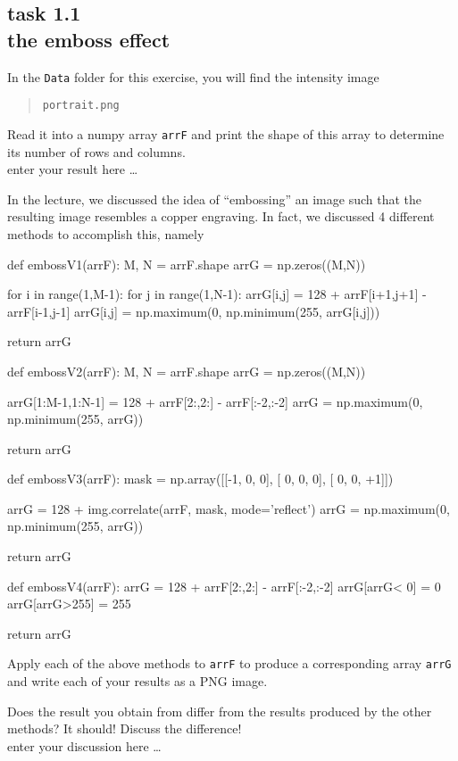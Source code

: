 
\subsection*{task 1.1 \\[1ex] the emboss effect}

In the \texttt{Data} folder for this exercise, you will find the intensity image
\begin{quote}
    \texttt{portrait.png}
\end{quote}
Read it into a numpy array \texttt{arrF} and print the shape of this array to determine its number of rows and columns.
\color{blue} \\[1ex]
enter your result here \ldots
\color{black}

In the lecture, we discussed the idea of ``embossing'' an image such that the resulting image resembles a copper engraving. In fact, we discussed 4 different methods to accomplish this, namely
\begin{python}[emph={embossV1,embossV2,embossV3,embossV4}]
def embossV1(arrF):
    M, N = arrF.shape
    arrG = np.zeros((M,N))

    for i in range(1,M-1):
        for j in range(1,N-1):
            arrG[i,j] = 128 + arrF[i+1,j+1] - arrF[i-1,j-1]
            arrG[i,j] = np.maximum(0, np.minimum(255, arrG[i,j]))

    return arrG


def embossV2(arrF):
    M, N = arrF.shape
    arrG = np.zeros((M,N))
    
    arrG[1:M-1,1:N-1] = 128 + arrF[2:,2:] - arrF[:-2,:-2]
    arrG = np.maximum(0, np.minimum(255, arrG))

    return arrG


def embossV3(arrF):
    mask = np.array([[-1, 0,  0],
                     [ 0, 0,  0],
                     [ 0, 0, +1]])

    arrG = 128 + img.correlate(arrF, mask, mode='reflect')
    arrG = np.maximum(0, np.minimum(255, arrG))

    return arrG
    
  
def embossV4(arrF):
    arrG = 128 + arrF[2:,2:] - arrF[:-2,:-2]
    arrG[arrG<  0] =   0
    arrG[arrG>255] = 255

    return arrG
\end{python}

\newpage

Apply each of the above methods to \texttt{arrF} to produce a corresponding array \texttt{arrG} and write each of your results as a PNG image.

Does the result you obtain from  differ from the results produced by the other methods? It should! Discuss the difference!
\color{blue} \\[1ex]
enter your discussion here \ldots
\color{black}

